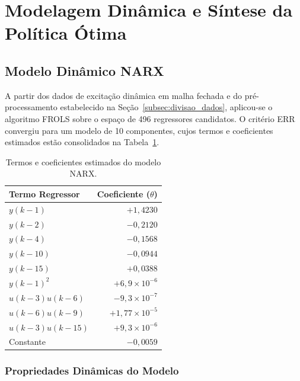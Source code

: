 \section{Modelagem Dinâmica e Síntese da Política Ótima}
\label{sec:res_modelagem}

\subsection{Modelo Dinâmico NARX}
\label{sec:res_narx}

A partir dos dados de excitação dinâmica em malha fechada e do pré-processamento estabelecido na Seção~\ref{subsec:divisao_dados}, aplicou-se o algoritmo FROLS sobre o espaço de 496 regressores candidatos. O critério ERR convergiu para um modelo de 10 componentes, cujos termos e coeficientes estimados estão consolidados na Tabela~\ref{tab:narx_termos}.

\begin{table}[H]
    \centering
    \caption{Termos e coeficientes estimados do modelo NARX.}
    \label{tab:narx_termos}
    \begin{tabular}{lr}
        \toprule
        \textbf{Termo Regressor} & \textbf{Coeficiente ($\theta$)} \\ \midrule
        $y(k-1)$          & $+1{,}4230$                \\
        $y(k-2)$          & $-0{,}2120$                \\
        $y(k-4)$          & $-0{,}1568$                \\
        $y(k-10)$         & $-0{,}0944$                \\
        $y(k-15)$         & $+0{,}0388$                \\
        $y(k-1)^2$        & $+6{,}9\times10^{-6}$      \\
        $u(k-3)u(k-6)$    & $-9{,}3\times10^{-7}$      \\
        $u(k-6)u(k-9)$    & $+1{,}77\times10^{-5}$     \\
        $u(k-3)u(k-15)$   & $+9{,}3\times10^{-6}$      \\
        Constante         & $-0{,}0059$                \\ \bottomrule
    \end{tabular}
\end{table}

\subsubsection{Propriedades Dinâmicas do Modelo}

